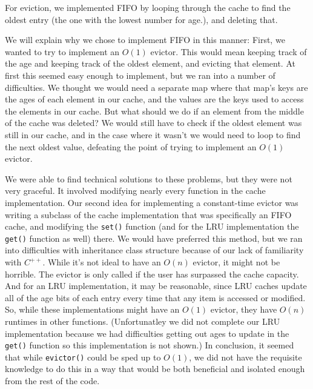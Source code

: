 \documentclass[12pt]{article}
\begin{document}
For eviction, we implemented FIFO by looping through the cache to find the oldest entry (the one with the lowest number for age.), and deleting
that.

We will explain why we chose to implement FIFO in this manner: First, we wanted to try to implement an $O(1)$ evictor.
This would mean keeping track of the age and keeping track of the oldest element, and evicting that element.
At first this seemed easy enough to implement, but we ran into a number of difficulties. We thought we would need a separate map where that
map's keys are the ages of each element in our cache, and the values are the keys used to access the elements in our cache. But what should we
do if an element from the middle of the cache was deleted? We would still have to check if the oldest element was still in our cache, and in the
case where it wasn't we would need to loop to find the next oldest value, defeating the point of trying to implement an $O(1)$ evictor.

We were able to find technical solutions to these problems, but they were not very graceful. It involved modifying nearly every function in the
cache implementation. Our second idea for implementing a constant-time evictor was writing a subclass of the cache implementation that was
specifically an FIFO cache, and modifying the \texttt{set()} function (and for the LRU implementation the \texttt{get()} function as well) there.
We would have preferred this method, but we ran into difficulties with inheritance class structure because of our lack of familiarity with $C^{++}
$. While it's not ideal to have an $O(n)$ evictor, it might not be horrible. The evictor is only called if the user has surpassed the cache
capacity. And for an LRU implementation, it may be reasonable, since LRU caches update all of the age bits of each entry every time that any item
is accessed or modified. So, while these implementations might have an $O(1)$ evictor, they have $O(n)$ runtimes in other functions.
(Unfortunatley we did not complete our LRU implementation because we had difficulties getting out ages to update in the \texttt{get()} function
so this implementation is not shown.) In conclusion, it seemed that while \texttt{evictor()} could be sped up to $O(1)$, we did not have the
requisite knowledge to do this in a way that would be both beneficial and isolated enough from the rest of the code. 
\end{document}
